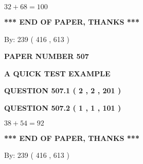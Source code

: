 \documentclass[12pt]{article}
\begin{document}
  
 
 

$ %
32 +  %
68=   %
100$
 
 
   
   
 \vspace{0.2in}
 
   
   
   
   
\vspace{1.0in} 
{\textbf{\large{ *** END OF PAPER, THANKS *** }}} 
   
   
\hspace{1.0in} By: 
 239 ( 416 ,  613 )
   
   
   
   
\newpage 
\setcounter{page}{ 
   507001 } 
   
   
   
   
 {\textbf{ \Large{ PAPER NUMBER  507  }}}
   
   
\vspace{0.2in}
   
   
   
   
   
   
 \vspace{0.2in}
{\LARGE {\textbf{ A QUICK TEST EXAMPLE}}}
   
   
  
\vspace{0.2in}
  
{\textbf{\Large{QUESTION
507.1 
 ( 2 , 2 , 201 )
}}}
  
  
  
\vspace{0.2in}
  
{\textbf{\Large{QUESTION
507.2 
 ( 1 , 1 , 101 )
}}}
  
  
 
 

$ %
38 +  %
54=   %
92$
 
 
   
   
 \vspace{0.2in}
 
   
   
   
   
\vspace{1.0in} 
{\textbf{\large{ *** END OF PAPER, THANKS *** }}} 
   
   
\hspace{1.0in} By: 
 239 ( 416 ,  613 )
   
\end{document}
